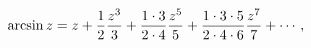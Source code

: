 \[\mathop{\mathrm{arcsin}\/}\nolimits z=z+\frac{1}{2}\frac{z^{3}}{3}+\frac{1%
\cdot 3}{2\cdot 4}\frac{z^{5}}{5}+\frac{1\cdot 3\cdot 5}{2\cdot 4\cdot 6}\frac%
{z^{7}}{7}+\cdots,\]